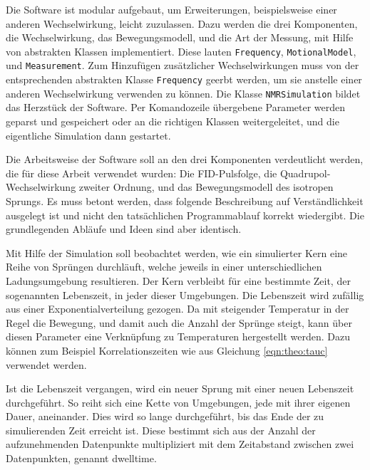 Die Software ist modular aufgebaut, um Erweiterungen, beispielsweise einer anderen Wechselwirkung, leicht zuzulassen. Dazu werden die drei Komponenten, die Wechselwirkung, das Bewegungsmodell, und die Art der Messung, mit Hilfe von abstrakten Klassen implementiert. Diese lauten \texttt{Frequency}, \texttt{MotionalModel}, und \texttt{Measurement}. Zum Hinzufügen zusätzlicher Wechselwirkungen muss von der entsprechenden abstrakten Klasse \texttt{Frequency} geerbt werden, um sie anstelle einer anderen Wechselwirkung verwenden zu können. Die Klasse \texttt{NMRSimulation} bildet das Herzstück der Software. Per Komandozeile übergebene Parameter werden geparst und gespeichert oder an die richtigen Klassen weitergeleitet, und die eigentliche Simulation dann gestartet.

Die Arbeitsweise der Software soll an den drei Komponenten verdeutlicht werden, die für diese Arbeit verwendet wurden: Die FID-Pulsfolge, die Quadrupol-Wechselwirkung zweiter Ordnung, und das Bewegungsmodell des isotropen Sprungs. Es muss betont werden, dass folgende Beschreibung auf Verständlichkeit ausgelegt ist und nicht den tatsächlichen Programmablauf korrekt wiedergibt. Die grundlegenden Abläufe und Ideen sind aber identisch.

Mit Hilfe der Simulation soll beobachtet werden, wie ein simulierter Kern eine Reihe von Sprüngen durchläuft, welche jeweils in einer unterschiedlichen Ladungsumgebung resultieren. Der Kern verbleibt für eine bestimmte Zeit, der sogenannten Lebenszeit, in jeder dieser Umgebungen. Die Lebenszeit wird zufällig aus einer Exponentialverteilung gezogen. Da mit steigender Temperatur in der Regel die Bewegung, und damit auch die Anzahl der Sprünge steigt, kann über diesen Parameter eine Verknüpfung zu Temperaturen hergestellt werden. Dazu können zum Beispiel Korrelationszeiten wie aus Gleichung \eqref{eqn:theo:tauc} verwendet werden.

Ist die Lebenszeit vergangen, wird ein neuer Sprung mit einer neuen Lebenszeit durchgeführt. So reiht sich eine Kette von Umgebungen, jede mit ihrer eigenen Dauer, aneinander. Dies wird so lange durchgeführt, bis das Ende der zu simulierenden Zeit erreicht ist. Diese bestimmt sich aus der Anzahl der aufzunehmenden Datenpunkte multipliziert mit dem Zeitabstand zwischen zwei Datenpunkten, genannt dwelltime.

